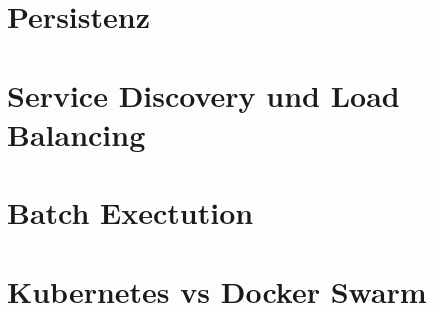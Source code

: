 \section{Persistenz}

\section{Service Discovery und Load Balancing}

\section{Batch Exectution}

\section{Kubernetes vs Docker Swarm}